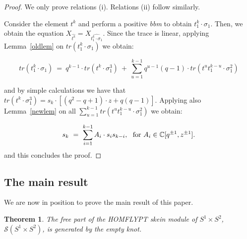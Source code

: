 \documentclass[11pt]{amsart}
\newtheorem{thm}{Theorem}
\begin{document}
\begin{proof}
We only prove relations (i). Relations (ii) follow similarly.

\bigbreak

Consider the element $t^k$ and perform a positive {\it bbm} to obtain $t_1^k\cdot \sigma_1$. Then, we obtain the equation $X_{\widehat{t^k}}=X_{\widehat{t_1^k\cdot \sigma_1}}$. Since the trace is linear, applying Lemma~\ref{oldlem} on $tr(t_1^k\cdot \sigma_1)$ we obtain:

\[
tr(t_1^k\cdot \sigma_1)\ =\ q^{k-1}\cdot tr(t^k\cdot \sigma_1^3)\ +\ \sum_{u=1}^{k-1}q^{u-1}(q-1)\cdot tr(t^{u}t_1^{k-u}\cdot \sigma_1^2)
\]

\noindent and by simple calculations we have that $tr(t^k\cdot \sigma_1^3)=s_k\cdot [(q^2-q+1)\cdot z+q(q-1)]$. Applying also Lemma~\ref{newlem} on all $\sum_{u=1}^{k-1} tr(t^{u}t_1^{k-u}\cdot \sigma_1^2)$ we obtain:

\[
s_k\ =\ \sum_{i=1}^{k-1} A_i\cdot s_{i}s_{k-i},\ \ {\rm for}\ A_i\in \mathbb{C}[q^{\pm 1}, z^{\pm 1}].
\]
 \noindent and this concludes the proof.
\noindent 
\end{proof}




\subsection{The main result}



We are now in position to prove the main result of this paper. 


\begin{thm}\label{depthm}
The free part of the HOMFLYPT skein module of $S^1\times S^2$, $\mathcal{S}(S^1\times S^2)$, is generated by the empty knot.
\end{thm}
\end{document}
